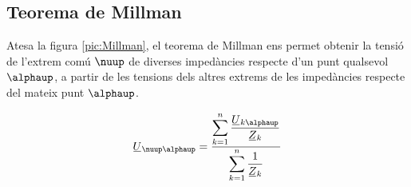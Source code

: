 \subsection{Teorema de Millman}\label{sec:millman}

Atesa la figura \vref{pic:Millman}, el teorema
de Millman ens permet
obtenir la tensió de l'extrem comú $\nuup$ de diverses impedàncies respecte d'un punt
qualsevol $\alphaup$, a partir de les tensions dels altres extrems de les impedàncies respecte  del mateix punt $\alphaup$.

\hfill
\begin{minipage}[b]{7cm}
    
    \label{pic:Millman}
\end{minipage}
\hfill
\begin{minipage}[b][4.5cm][t]{6cm}
    \begin{equation}
        \cmplx{U}_{\nuup\alphaup} = \frac{\displaystyle\sum_{k=1}^n \dfrac{\cmplx{U}_{k\alphaup}}{\cmplx{Z}_k}} {\displaystyle\sum_{k=1}^n \dfrac{1}{\cmplx{Z}_k}}
        \label{eq:millman}
    \end{equation}
\end{minipage}

\vspace{5mm}

